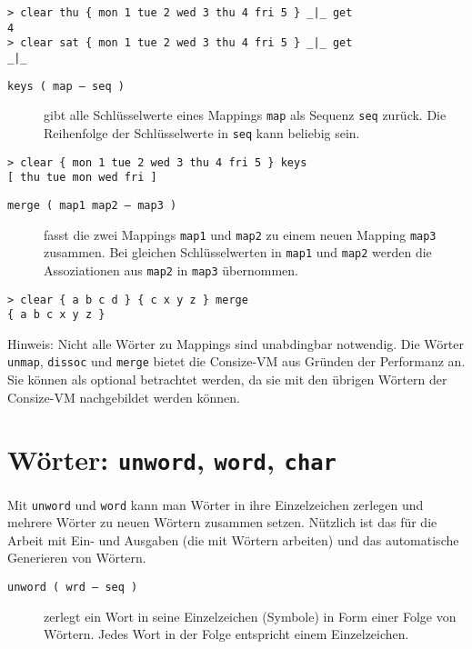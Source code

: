\begin{verbatim}
> clear thu { mon 1 tue 2 wed 3 thu 4 fri 5 } _|_ get
4
> clear sat { mon 1 tue 2 wed 3 thu 4 fri 5 } _|_ get
_|_
\end{verbatim}

\begin{description}
\item[\texttt{keys ( map -- seq )}] gibt alle Schlüsselwerte eines Mappings \verb|map| als Sequenz \verb|seq| zurück. Die Reihenfolge der Schlüsselwerte in \verb|seq| kann beliebig sein.
\end{description}

\begin{verbatim}
> clear { mon 1 tue 2 wed 3 thu 4 fri 5 } keys
[ thu tue mon wed fri ]
\end{verbatim}

\begin{description}
\item[\texttt{merge ( map1 map2 -- map3 )}] fasst die zwei Mappings \verb|map1| und \verb|map2| zu einem neuen Mapping \verb|map3| zusammen. Bei gleichen Schlüsselwerten in \verb|map1| und \verb|map2| werden die Assoziationen aus \verb|map2| in \verb|map3| übernommen.
\end{description}

\begin{verbatim}
> clear { a b c d } { c x y z } merge
{ a b c x y z }
\end{verbatim}

Hinweis: Nicht alle Wörter zu Mappings sind unabdingbar notwendig. Die Wörter \verb|unmap|, \verb|dissoc| und \verb|merge| bietet die Consize-VM aus Gründen der Performanz an. Sie können als optional betrachtet werden, da sie mit den übrigen Wörtern der Consize-VM nachgebildet werden können.

\section{Wörter: \texttt{unword}, \texttt{word}, \texttt{char}}

Mit \verb|unword| und \verb|word| kann man Wörter in ihre Einzelzeichen zerlegen und mehrere Wörter zu neuen Wörtern zusammen setzen. Nützlich ist das für die Arbeit mit Ein- und Ausgaben (die mit Wörtern arbeiten) und das automatische Generieren von Wörtern. 

\begin{description}
\item[\texttt{unword ( wrd -- seq )}] zerlegt ein Wort in seine Einzelzeichen (Symbole) in Form einer Folge von Wörtern. Jedes Wort in der Folge entspricht einem Einzelzeichen.
\end{description}

